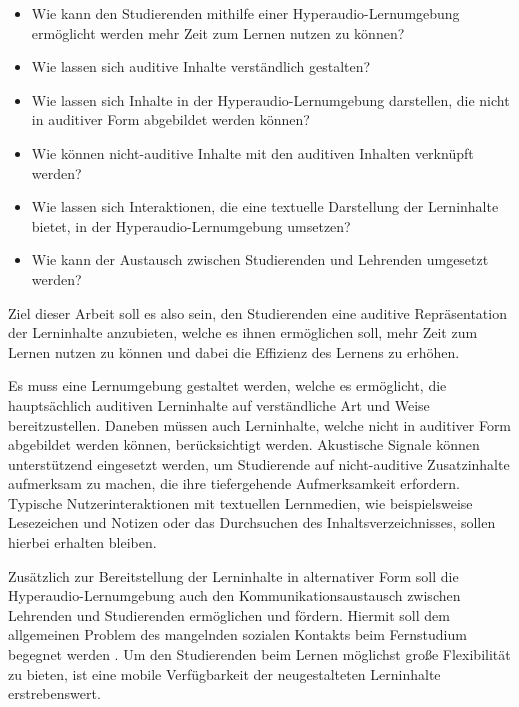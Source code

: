 \begin{itemize}
\item Wie kann den Studierenden mithilfe einer Hyperaudio-Lernumgebung ermöglicht werden mehr Zeit zum Lernen nutzen zu können?
\item Wie lassen sich auditive Inhalte verständlich gestalten?
\item Wie lassen sich Inhalte in der Hyperaudio-Lernumgebung darstellen, die nicht in auditiver Form abgebildet werden können?
\item Wie können nicht-auditive Inhalte mit den auditiven Inhalten verknüpft werden?
\item Wie lassen sich Interaktionen, die eine textuelle Darstellung der Lerninhalte bietet, in der Hyperaudio-Lernumgebung umsetzen?
\item Wie kann der Austausch zwischen Studierenden und Lehrenden umgesetzt werden?
\end{itemize}

Ziel dieser Arbeit soll es also sein, den Studierenden eine auditive Repräsentation der Lerninhalte anzubieten, welche es ihnen ermöglichen soll, mehr Zeit zum Lernen nutzen zu können und dabei die Effizienz des Lernens zu erhöhen. 

Es muss eine Lernumgebung gestaltet werden, welche es ermöglicht, die hauptsächlich auditiven Lerninhalte auf verständliche Art und Weise bereitzustellen. Daneben müssen auch Lerninhalte, welche nicht in auditiver Form abgebildet werden können, berücksichtigt werden. Akustische Signale können unterstützend eingesetzt werden, um Studierende auf nicht-auditive Zusatzinhalte aufmerksam zu machen, die ihre tiefergehende Aufmerksamkeit erfordern. Typische Nutzerinteraktionen mit textuellen Lernmedien, wie beispielsweise Lesezeichen und Notizen oder das Durchsuchen des Inhaltsverzeichnisses, sollen hierbei erhalten bleiben.

Zusätzlich zur Bereitstellung der Lerninhalte in alternativer Form soll die Hyperaudio-Lernumgebung auch den Kommunikationsaustausch zwischen Lehrenden und Studierenden ermöglichen und fördern. Hiermit soll dem allgemeinen Problem des mangelnden sozialen Kontakts beim Fernstudium begegnet werden \citep{kerres2002didaktische}. Um den Studierenden beim Lernen möglichst große Flexibilität zu bieten, ist eine mobile Verfügbarkeit der neugestalteten Lerninhalte erstrebenswert.



